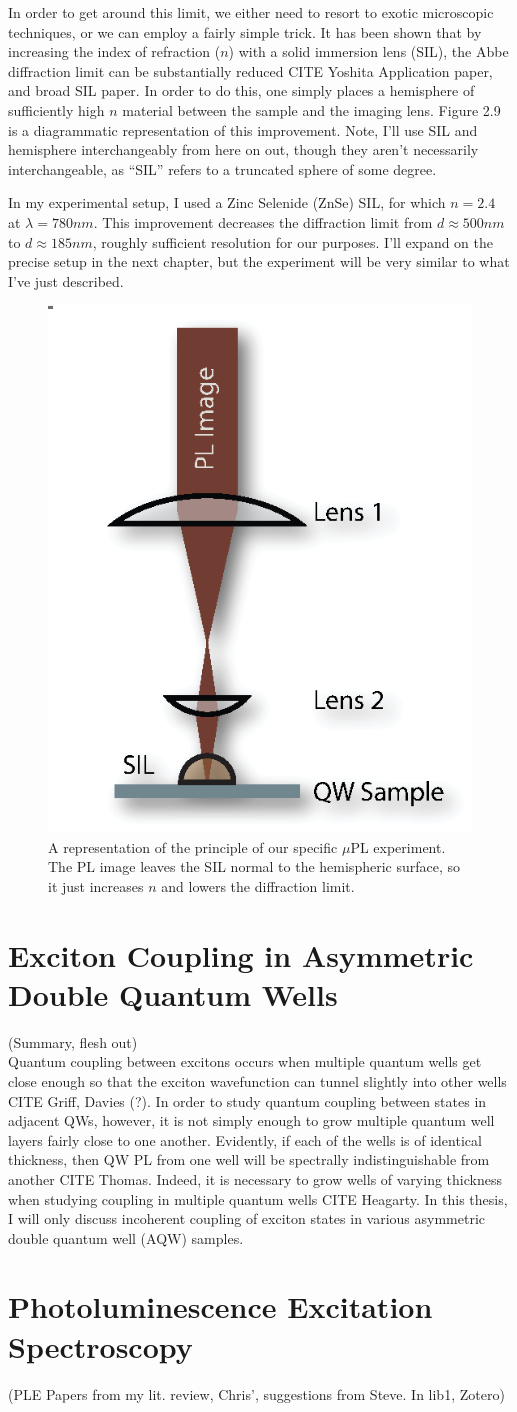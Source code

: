 \indent In order to get around this limit, we either need to resort to exotic microscopic techniques, or we can employ a fairly simple trick. It has been shown that by increasing the index of refraction ($n$) with a solid immersion lens (SIL), the Abbe diffraction limit can be substantially reduced  CITE Yoshita Application paper, and broad SIL paper. In order to do this, one simply places a hemisphere of sufficiently high $n$ material between the sample and the imaging lens. Figure 2.9 is a diagrammatic representation of this improvement. Note, I'll use SIL and hemisphere interchangeably from here on out, though they aren't necessarily interchangeable, as ``SIL'' refers to a truncated sphere of some degree. 

\indent In my experimental setup, I used a Zinc Selenide (ZnSe) SIL, for which $n = 2.4$ at $\lambda = 780 nm$. This improvement decreases the diffraction limit from $d \approx 500nm$ to $ d \approx 185 nm$, roughly sufficient resolution for our purposes. I'll expand on the precise setup in the next chapter, but the experiment will be very similar to what I've just described.
\begin{figure}[h!]
\label{confocal2}
\centering
\includegraphics[width = .3\textwidth]{confocal2.eps}
\caption{\doublespacing A representation of the principle of our specific $\mu$PL experiment. The PL image leaves the SIL normal to the hemispheric surface, so it just increases $n$ and lowers the diffraction limit.}
\end{figure}


\section{Exciton Coupling in Asymmetric Double Quantum Wells}

\indent (Summary, flesh out) \\
Quantum coupling between excitons occurs when multiple quantum wells get close enough so that the exciton wavefunction can tunnel slightly into other wells CITE Griff, Davies (?). In order to study quantum coupling between states in adjacent QWs, however, it is not simply enough to grow multiple quantum well layers fairly close to one another. Evidently, if each of the wells is of identical thickness, then QW PL  from one well will be spectrally indistinguishable from another CITE Thomas. Indeed, it is necessary to grow wells of varying thickness when studying coupling in multiple quantum wells CITE Heagarty. In this thesis, I will only discuss incoherent coupling of exciton states in various asymmetric double quantum well (AQW) samples.


\section{Photoluminescence Excitation Spectroscopy}
(PLE Papers from my lit. review, Chris', suggestions from Steve. In lib1, Zotero)